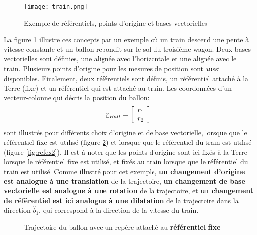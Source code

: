 \begin{figure}[H]
	\centering
		\texttt{[image: train.png]}
	\caption{Exemple de référentiels, points d'origine et bases vectorielles}
	\label{fig:train}
\end{figure}

La figure \ref{fig:train} illustre ces concepts par un exemple où un train descend une pente à vitesse constante et un ballon rebondit sur le sol du troisième wagon. Deux bases vectorielles sont définies, une alignée avec l'horizontale et une alignée avec le train. Plusieurs points d'origine pour les mesures de position sont aussi disponibles. Finalement, deux référentiels sont définis, un référentiel attaché à la Terre (fixe) et un référentiel qui est attaché au train. Les coordonnées d'un vecteur-colonne qui décris la position du ballon:
\begin{equation}
\underline{r}_{Ball} = \left[ \begin{array}{c} r_1 \\ r_2 \end{array} \right]
\end{equation}
sont illustrés pour différents choix d'origine et de base vectorielle, lorsque que le référentiel fixe est utilisé (figure \ref{fig:refex1}) et lorsque que le référentiel du train est utilisé (figure \ref{fig:refex2}). Il est à noter que les points d'origine sont ici fixés à la Terre lorsque le référentiel fixe est utilisé, et fixés au train lorsque que le référentiel du train est utilisé. Comme illustré pour cet exemple, \textbf{un changement d'origine est analogue à une translation} de la trajectoire, \textbf{un changement de base vectorielle est analogue à une rotation} de la trajectoire, et \textbf{un changement de référentiel est ici analogue à une dilatation} de la trajectoire dans la direction $\hat{b}_1$, qui correspond à la direction de la vitesse du train. 

\begin{figure}[htpb]
        \centering
         \hspace{20pt}
				 \hspace{190pt}
				 \hspace{20pt}
        \caption{Trajectoire du ballon avec un repère attaché au \textbf{référentiel fixe}}
				\label{fig:refex1}
\end{figure}

